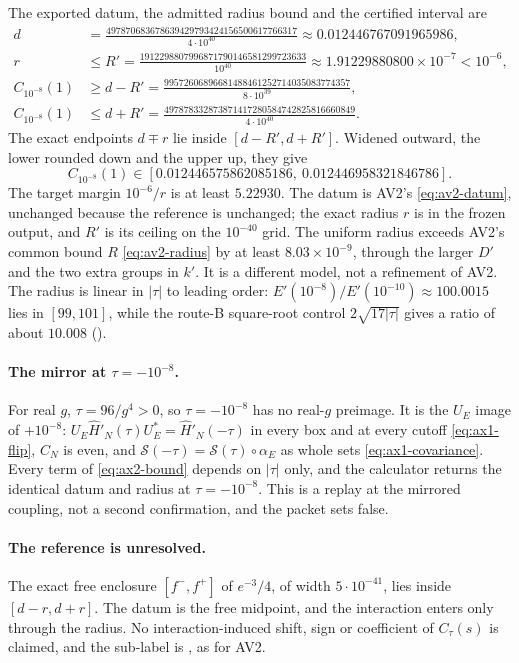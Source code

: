 The exported datum, the admitted radius bound and the certified interval are
\begin{align}
 d&=\frac{497870683678639429793424156500617766317}{4\cdot10^{40}}
 \approx0.012446767091965986,\label{eq:ax2-datum}\\
 r&\le R'=\frac{1912298807996871790146581299723633}{10^{40}}
 \approx1.91229880800\times10^{-7}<10^{-6},\label{eq:ax2-radius}\\
 C_{10^{-8}}(1)&\ge d-R'=\frac{99572606896681488461252714035083774357}{8\cdot10^{39}},
 \label{eq:ax2-lower}\\
 C_{10^{-8}}(1)&\le d+R'=\frac{497878332873871417280584742825816660849}{4\cdot10^{40}}.
 \label{eq:ax2-upper}
\end{align}
The exact endpoints $d\mp r$ lie inside $[d-R',d+R']$. Widened outward, the
lower rounded down and the upper up, they give
\[
 C_{10^{-8}}(1)\in[0.012446575862085186,\ 0.012446958321846786].
\]
The target margin $10^{-6}/r$ is at least $5.22930$. The datum is AV2's
\eqref{eq:av2-datum}, unchanged because the reference is unchanged; the exact
radius $r$ is in the frozen output, and $R'$ is its ceiling on the $10^{-40}$
grid. The uniform radius exceeds AV2's common bound $R$ \eqref{eq:av2-radius}
by at least $8.03\times10^{-9}$, through the larger $D'$ and the two extra
groups in $k'$. It is a different model, not a refinement of AV2. The radius
is linear in $|\tau|$ to leading order:
$E'(10^{-8})/E'(10^{-10})\approx100.0015$ lies in $[99,101]$, while the
route-B square-root control $2\sqrt{17|\tau|}$ gives a ratio of about
$10.008$ ().

\paragraph{The mirror at $\tau=-10^{-8}$.}
For real $g$, $\tau=96/g^4>0$, so $\tau=-10^{-8}$ has no real-$g$ preimage. It
is the $U_E$ image of $+10^{-8}$: $U_E\widehat H'_N(\tau)U_E^*=\widehat
H'_N(-\tau)$ in every box and at every cutoff \eqref{eq:ax1-flip}, $C_N$ is
even, and $\mathcal S(-\tau)=\mathcal S(\tau)\circ\alpha_E$ as whole sets
\eqref{eq:ax1-covariance}. Every term of \eqref{eq:ax2-bound} depends on
$|\tau|$ only, and the calculator returns the identical datum and radius at
$\tau=-10^{-8}$. This is a replay at the mirrored coupling, not a second
confirmation, and the packet sets  false.

\paragraph{The reference is unresolved.}
The exact free enclosure $[f^-,f^+]$ of $e^{-3}/4$, of width $5\cdot10^{-41}$,
lies inside $[d-r,d+r]$. The datum is the free midpoint, and the interaction
enters only through the radius. No interaction-induced shift, sign or
coefficient of $C_\tau(s)$ is claimed, and the sub-label is
, as for AV2.

